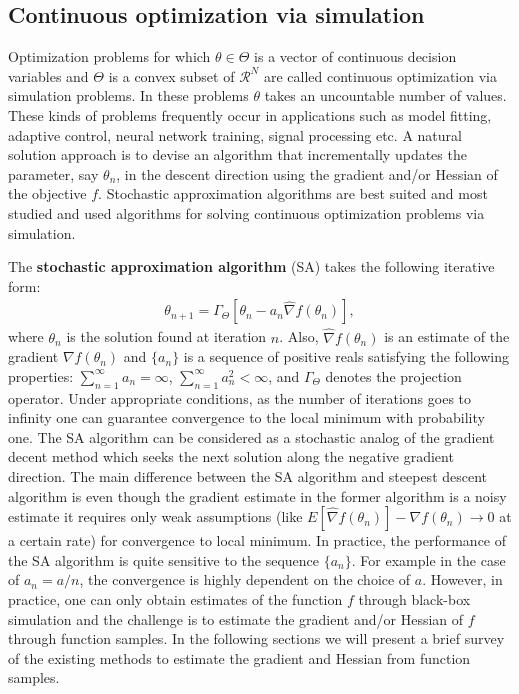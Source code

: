 \subsection{Continuous optimization via simulation}
Optimization problems for which $\theta \in \Theta$ is a vector of continuous decision variables and $\Theta$ is a convex subset of $\mathcal{R}^N$ are called continuous optimization via simulation  problems. In these problems $\theta$  takes an uncountable number of values. These kinds of problems frequently occur in applications such as model fitting, adaptive control, neural network training, signal processing etc. A natural solution approach is to devise an algorithm that incrementally updates the parameter, say $\theta_n$, in the descent direction using the gradient and/or Hessian of the objective $f$. Stochastic approximation algorithms are best suited and most studied and used algorithms for solving continuous optimization problems via simulation.\par
The \textbf{stochastic approximation algorithm} (SA) takes the following iterative form:
\begin{align}\label{saalg}
\theta_{n+1} = \Gamma_{\Theta} \left [\theta_{n} - a_{n} \widehat{\nabla} f(\theta_{n}) \right],
\end{align}
where $\theta_{n}$ is the solution found at iteration $n$. Also, $ \widehat{\nabla} f(\theta_{n})$ is an estimate of the gradient $ {\nabla} f(\theta_{n})$ and $\{a_{n}\}$ is a sequence of positive reals satisfying the following properties: $\sum_{n=1}^{\infty} a_{n}  = \infty$,  $\sum_{n = 1}^{\infty} a_{n}^{2} < \infty$, and $\Gamma_{\Theta}$ denotes the projection operator. Under appropriate conditions, as the number of iterations goes to infinity one can guarantee convergence to the local minimum with probability one. The SA algorithm can be considered as a stochastic analog of the gradient decent method which seeks the next solution along the negative gradient direction. The main difference between the SA algorithm and steepest descent algorithm is even though the gradient estimate in the former algorithm is a noisy estimate it requires only weak assumptions (like $E \left[\widehat{\nabla} f(\theta_{n})\right] - \nabla f(\theta_{n}) \to 0 $ at a certain rate) for convergence to local minimum. In practice, the performance of the SA algorithm is quite sensitive to the sequence $\{a_{n}\}$.  For example in the case of $ a_n = a/n$, the convergence is highly dependent on the choice of $a$. However, in practice, one can only obtain estimates of the function $f$ through black-box simulation and the challenge is to estimate the gradient and/or Hessian of $f$ through function samples.  In the following sections we will present a brief survey of the existing methods to estimate the gradient and Hessian from function samples.
